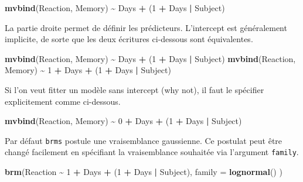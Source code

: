 \documentclass[
  a4paper,11pt,twoside,onecolumn,openright,final,oldfontcommands]{memoir}
\newenvironment{Shaded}{\begin{snugshade}}{\end{snugshade}}
\newcommand{\DataTypeTok}[1]{\textcolor[rgb]{0.13,0.29,0.53}{#1}}
\newcommand{\DecValTok}[1]{\textcolor[rgb]{0.00,0.00,0.81}{#1}}
\newcommand{\KeywordTok}[1]{\textcolor[rgb]{0.13,0.29,0.53}{\textbf{#1}}}
\newcommand{\NormalTok}[1]{#1}
\newcommand{\OperatorTok}[1]{\textcolor[rgb]{0.81,0.36,0.00}{\textbf{#1}}}
\newcommand{\StringTok}[1]{\textcolor[rgb]{0.31,0.60,0.02}{#1}}
\theoremstyle{definition}
\theoremstyle{definition}
\theoremstyle{definition}
\theoremstyle{remark}
\begin{document}
\begin{Shaded}
\begin{Highlighting}[]
\KeywordTok{mvbind}\NormalTok{(Reaction, Memory) }\OperatorTok{\textasciitilde{}}\StringTok{ }\NormalTok{Days }\OperatorTok{+}\StringTok{ }\NormalTok{(}\DecValTok{1} \OperatorTok{+}\StringTok{ }\NormalTok{Days }\OperatorTok{|}\StringTok{ }\NormalTok{Subject)}
\end{Highlighting}
\end{Shaded}

La partie droite permet de définir les prédicteurs. L'intercept est généralement implicite, de sorte que les deux écritures ci-dessous sont équivalentes.

\begin{Shaded}
\begin{Highlighting}[]
\KeywordTok{mvbind}\NormalTok{(Reaction, Memory) }\OperatorTok{\textasciitilde{}}\StringTok{ }\NormalTok{Days }\OperatorTok{+}\StringTok{ }\NormalTok{(}\DecValTok{1} \OperatorTok{+}\StringTok{ }\NormalTok{Days }\OperatorTok{|}\StringTok{ }\NormalTok{Subject)}
\KeywordTok{mvbind}\NormalTok{(Reaction, Memory) }\OperatorTok{\textasciitilde{}}\StringTok{ }\DecValTok{1} \OperatorTok{+}\StringTok{ }\NormalTok{Days }\OperatorTok{+}\StringTok{ }\NormalTok{(}\DecValTok{1} \OperatorTok{+}\StringTok{ }\NormalTok{Days }\OperatorTok{|}\StringTok{ }\NormalTok{Subject)}
\end{Highlighting}
\end{Shaded}

Si l'on veut fitter un modèle sans intercept (why not), il faut le spécifier explicitement comme ci-dessous.

\begin{Shaded}
\begin{Highlighting}[]
\KeywordTok{mvbind}\NormalTok{(Reaction, Memory) }\OperatorTok{\textasciitilde{}}\StringTok{ }\DecValTok{0} \OperatorTok{+}\StringTok{ }\NormalTok{Days }\OperatorTok{+}\StringTok{ }\NormalTok{(}\DecValTok{1} \OperatorTok{+}\StringTok{ }\NormalTok{Days }\OperatorTok{|}\StringTok{ }\NormalTok{Subject)}
\end{Highlighting}
\end{Shaded}

Par défaut \texttt{brms} postule une vraisemblance gaussienne. Ce postulat peut être changé facilement en spécifiant la vraisemblance souhaitée via l'argument \texttt{family}.

\begin{Shaded}
\begin{Highlighting}[]
\KeywordTok{brm}\NormalTok{(Reaction }\OperatorTok{\textasciitilde{}}\StringTok{ }\DecValTok{1} \OperatorTok{+}\StringTok{ }\NormalTok{Days }\OperatorTok{+}\StringTok{ }\NormalTok{(}\DecValTok{1} \OperatorTok{+}\StringTok{ }\NormalTok{Days }\OperatorTok{|}\StringTok{ }\NormalTok{Subject), }\DataTypeTok{family =} \KeywordTok{lognormal}\NormalTok{() )}
\end{Highlighting}
\end{Shaded}
\end{document}
